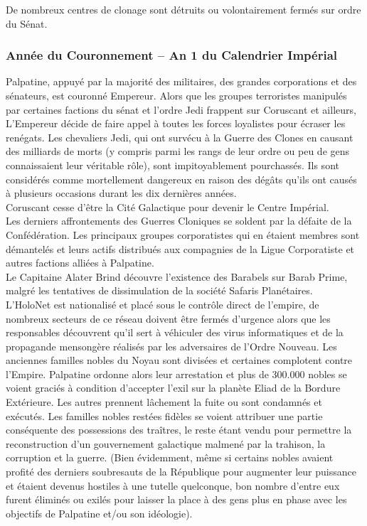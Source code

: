 \documentclass[twoside]{article}
\begin{document}
De nombreux centres de clonage sont détruits ou volontairement fermés sur ordre du Sénat.

\subsubsection*{Année du Couronnement -- An 1 du Calendrier Impérial}
Palpatine, appuyé par la majorité des militaires, des grandes corporations et des sénateurs, est couronné Empereur. Alors que les groupes terroristes manipulés par certaines factions du sénat et l'ordre Jedi frappent sur Coruscant et ailleurs, L'Empereur décide de faire appel à toutes les forces loyalistes pour écraser les renégats. Les chevaliers Jedi, qui ont survécu à la Guerre des Clones en causant des milliards de morts (y compris parmi les rangs de leur ordre ou peu de gens connaissaient leur véritable rôle), sont impitoyablement pourchassés. Ils sont considérés comme mortellement dangereux en raison des dégâts qu'ils ont causés à plusieurs occasions durant les dix dernières années.\\

Coruscant cesse d'être la Cité Galactique pour devenir le Centre Impérial.\\

Les derniers affrontements des Guerres Cloniques se soldent par la défaite de la Confédération. Les principaux groupes corporatistes qui en étaient membres sont démantelés et leurs actifs distribués aux compagnies de la Ligue Corporatiste et autres factions alliées à Palpatine.\\

Le Capitaine Alater Brind découvre l'existence des Barabels sur Barab Prime, malgré les tentatives de dissimulation de la société Safaris Planétaires.\\

L'HoloNet est nationalisé et placé sous le contrôle direct de l'empire, de nombreux secteurs de ce réseau doivent être fermés d'urgence alors que les responsables découvrent qu'il sert à véhiculer des virus informatiques et de la propagande mensongère réalisés par les adversaires de l'Ordre Nouveau. Les anciennes familles nobles du Noyau sont divisées et certaines complotent contre l'Empire. Palpatine ordonne alors leur arrestation et plus de 300.000 nobles se voient graciés à condition d'accepter l'exil sur la planète Eliad de la Bordure Extérieure. Les autres prennent lâchement la fuite ou sont condamnés et exécutés. Les familles nobles restées fidèles se voient attribuer une partie conséquente des possessions des tra\^{i}tres, le reste étant vendu pour permettre la reconstruction d'un gouvernement galactique malmené par la trahison, la corruption et la guerre. (Bien évidemment, même si certains nobles avaient profité des derniers soubresauts de la République pour augmenter leur puissance et étaient devenus hostiles à une tutelle quelconque, bon nombre d'entre eux furent éliminés ou exilés pour laisser la place à des gens plus en phase avec les objectifs de Palpatine et/ou son idéologie).   
\end{document}

